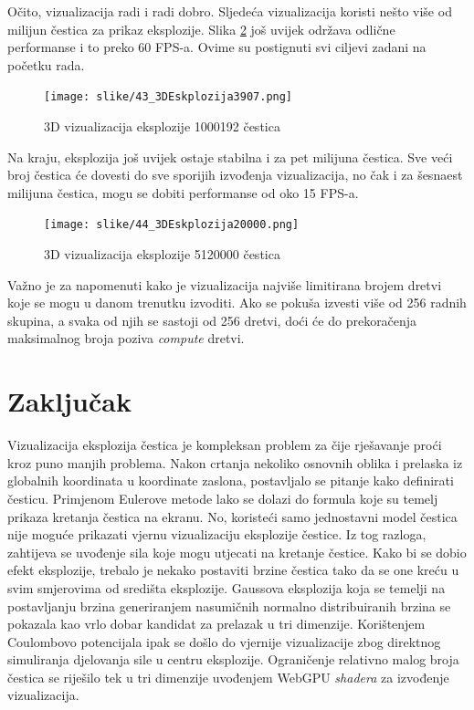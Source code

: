 \documentclass{foi}
\begin{document}
Očito, vizualizacija radi i radi dobro. Sljedeća vizualizacija koristi nešto više od milijun čestica za prikaz eksplozije. Slika \ref{fig:3D_2000} još uvijek održava odlične performanse i to preko 60 FPS-a. Ovime su postignuti svi ciljevi zadani na početku rada.
\\
\begin{figure}[H]
	\centering
	\texttt{[image: slike/43\_3DEskplozija3907.png]}
	\captionsetup{justification=centering}
	\caption{3D vizualizacija eksplozije 1000192 čestica}
	\label{fig:3D_3907}
\end{figure}

Na kraju, eksplozija još uvijek ostaje stabilna i za pet milijuna čestica. Sve veći broj čestica će dovesti do sve sporijih izvođenja vizualizacija, no čak i za šesnaest milijuna čestica, mogu se dobiti performanse od oko 15 FPS-a. 
\\
\begin{figure}[H]
	\centering
	\texttt{[image: slike/44\_3DEskplozija20000.png]}
	\captionsetup{justification=centering}
	\caption{3D vizualizacija eksplozije 5120000 čestica}
	\label{fig:3D_2000}
\end{figure}

Važno je za napomenuti kako je vizualizacija najviše limitirana brojem dretvi koje se mogu u danom trenutku izvoditi. Ako se pokuša izvesti više od 256 radnih skupina, a svaka od njih se sastoji od 256 dretvi, doći će do prekoračenja maksimalnog broja poziva \textit{compute} dretvi. 
\chapter{Zaključak}
Vizualizacija eksplozija čestica je kompleksan problem za čije rješavanje proći kroz puno manjih problema. Nakon crtanja nekoliko osnovnih oblika i prelaska iz globalnih koordinata u koordinate zaslona, postavljalo se pitanje kako definirati česticu. Primjenom Eulerove metode lako se dolazi do formula koje su temelj prikaza kretanja čestica na ekranu. No, koristeći samo jednostavni model čestica nije moguće prikazati vjernu vizualizaciju eksplozije čestice. Iz tog razloga, zahtijeva se uvođenje sila koje mogu utjecati na kretanje čestice. Kako bi se dobio efekt eksplozije, trebalo je nekako postaviti brzine čestica tako da se one kreću u svim smjerovima od središta eksplozije. Gaussova eksplozija koja se temelji na postavljanju brzina generiranjem nasumičnih normalno distribuiranih brzina se pokazala kao vrlo dobar kandidat za prelazak u tri dimenzije. Korištenjem Coulombovo potencijala ipak se došlo do vjernije vizualizacije zbog direktnog simuliranja djelovanja sile u centru eksplozije. Ograničenje relativno malog broja čestica se riješilo tek u tri dimenzije uvođenjem WebGPU \textit{shadera} za izvođenje vizualizacija. 
\end{document}
